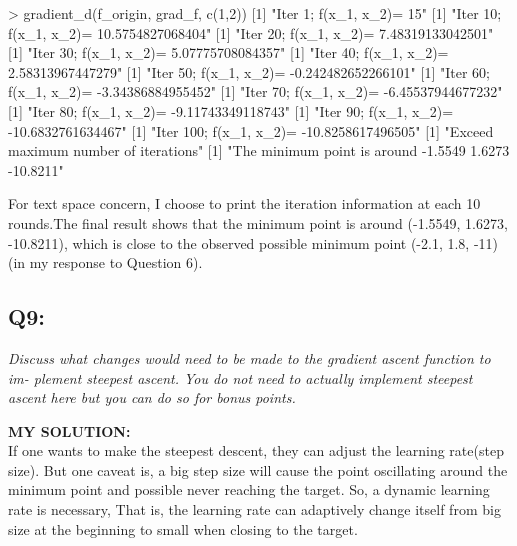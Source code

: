 \documentclass[
]{article}
\newenvironment{Shaded}{\begin{snugshade}}{\end{snugshade}}
\newcommand{\DecValTok}[1]{\textcolor[rgb]{0.00,0.00,0.81}{#1}}
\newcommand{\FunctionTok}[1]{\textcolor[rgb]{0.00,0.00,0.00}{#1}}
\newcommand{\NormalTok}[1]{#1}
\newcommand{\SpecialCharTok}[1]{\textcolor[rgb]{0.00,0.00,0.00}{#1}}
\newcommand{\StringTok}[1]{\textcolor[rgb]{0.31,0.60,0.02}{#1}}
\begin{document}
\begin{Shaded}
\begin{Highlighting}[]
\SpecialCharTok{\textgreater{}} \FunctionTok{gradient\_d}\NormalTok{(f\_origin, grad\_f, }\FunctionTok{c}\NormalTok{(}\DecValTok{1}\NormalTok{,}\DecValTok{2}\NormalTok{))}
\NormalTok{[}\DecValTok{1}\NormalTok{] }\StringTok{"Iter 1; f(x\_1, x\_2)= 15"}
\NormalTok{[}\DecValTok{1}\NormalTok{] }\StringTok{"Iter 10; f(x\_1, x\_2)= 10.5754827068404"}
\NormalTok{[}\DecValTok{1}\NormalTok{] }\StringTok{"Iter 20; f(x\_1, x\_2)= 7.48319133042501"}
\NormalTok{[}\DecValTok{1}\NormalTok{] }\StringTok{"Iter 30; f(x\_1, x\_2)= 5.07775708084357"}
\NormalTok{[}\DecValTok{1}\NormalTok{] }\StringTok{"Iter 40; f(x\_1, x\_2)= 2.58313967447279"}
\NormalTok{[}\DecValTok{1}\NormalTok{] }\StringTok{"Iter 50; f(x\_1, x\_2)= {-}0.242482652266101"}
\NormalTok{[}\DecValTok{1}\NormalTok{] }\StringTok{"Iter 60; f(x\_1, x\_2)= {-}3.34386884955452"}
\NormalTok{[}\DecValTok{1}\NormalTok{] }\StringTok{"Iter 70; f(x\_1, x\_2)= {-}6.45537944677232"}
\NormalTok{[}\DecValTok{1}\NormalTok{] }\StringTok{"Iter 80; f(x\_1, x\_2)= {-}9.11743349118743"}
\NormalTok{[}\DecValTok{1}\NormalTok{] }\StringTok{"Iter 90; f(x\_1, x\_2)= {-}10.6832761634467"}
\NormalTok{[}\DecValTok{1}\NormalTok{] }\StringTok{"Iter 100; f(x\_1, x\_2)= {-}10.8258617496505"}
\NormalTok{[}\DecValTok{1}\NormalTok{] }\StringTok{"Exceed maximum number of iterations"}
\NormalTok{[}\DecValTok{1}\NormalTok{] }\StringTok{"The minimum point is around {-}1.5549 1.6273 {-}10.8211"}
\end{Highlighting}
\end{Shaded}

For text space concern, I choose to print the iteration information at
each 10 rounds.The final result shows that the minimum point is around
(-1.5549, 1.6273, -10.8211), which is close to the observed possible
minimum point (-2.1, 1.8, -11) (in my response to Question 6).

\hypertarget{q9}{%
\subsection{Q9:}\label{q9}}

\emph{Discuss what changes would need to be made to the gradient ascent
function to im- plement steepest ascent. You do not need to actually
implement steepest ascent here but you can do so for bonus points.}

\textbf{MY SOLUTION:}\\
If one wants to make the steepest descent, they can adjust the learning
rate(step size). But one caveat is, a big step size will cause the point
oscillating around the minimum point and possible never reaching the
target. So, a dynamic learning rate is necessary, That is, the learning
rate can adaptively change itself from big size at the beginning to
small when closing to the target.
\end{document}

